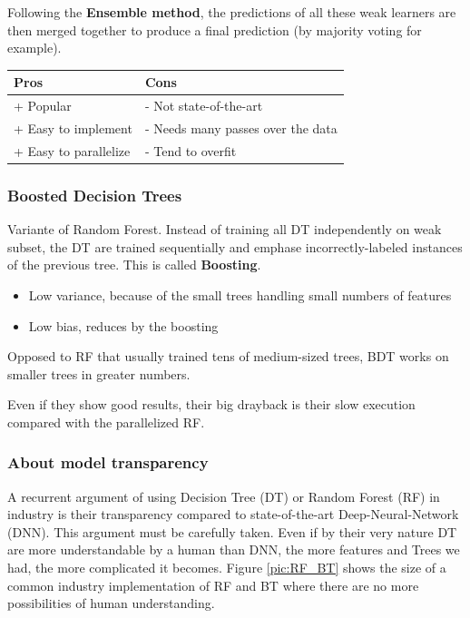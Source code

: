 Following the \textbf{Ensemble method}, the predictions of all these weak learners are then merged together to produce a final prediction (by majority voting for example).



\begin{center} %
\begin{tabular} {| l | l |}
\hline
\bf Pros & \bf Cons \\ \hline
+ Popular & - Not state-of-the-art  \\
+ Easy to implement & - Needs many passes over the data \\
+ Easy to parallelize & - Tend to overfit \\ 
\hline
\end{tabular}
\end{center}

\subsubsection{Boosted Decision Trees}
Variante of Random Forest. Instead of training all DT independently on weak subset, the DT are trained sequentially and emphase incorrectly-labeled instances of the previous tree. This is called \textbf{Boosting}. 
\begin{itemize}
\item Low variance, because of the small trees handling small numbers of features
\item Low bias, reduces by the boosting
\end{itemize}

Opposed to RF that usually trained tens of medium-sized trees, BDT works on smaller trees in greater numbers.

Even if they show good results, their big drayback is their slow execution compared with the parallelized RF.

\subsubsection{About model transparency}

A recurrent argument of using Decision Tree (DT) or Random Forest (RF) in industry is their transparency compared to state-of-the-art Deep-Neural-Network (DNN). This argument must be carefully taken. Even if by their very nature DT are more understandable by a human than DNN, the more features and Trees we had, the more complicated it becomes. Figure \ref{pic:RF_BT} shows the size of a common industry implementation of RF and BT where there are no more possibilities of human understanding.

